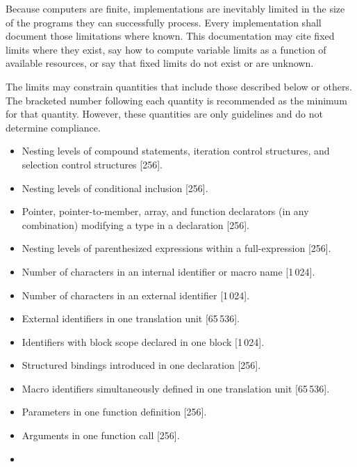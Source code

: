 
\pnum
Because computers are finite, \Cpp{}  implementations are inevitably
limited in the size of the programs they can successfully process.
Every implementation shall
document those limitations where known.
This documentation may cite fixed limits where they
exist, say how to compute variable limits as a function
of available resources, or say that fixed limits do not exist
or are unknown.

\pnum
The limits may constrain quantities
that include those described below or others.
The bracketed number following each quantity is recommended
as the minimum for that quantity.
However, these quantities are only guidelines and do not determine compliance.
\begin{itemize}
\item%
Nesting levels of compound statements,
iteration control structures,
and selection control structures [256].
\item%
Nesting levels of conditional inclusion [256].
\item%
Pointer,
pointer-to-member,
array, and
function
declarators (in any combination)
modifying a type in a declaration [256].
\item%
Nesting levels of parenthesized expressions within a full-expression [256].
\item%
Number of
characters in an internal identifier
or macro name [1\,024].
\item%
Number of
characters in an external identifier [1\,024].
\item%
External identifiers in one translation unit [65\,536].
\item%
Identifiers with block scope declared in one block [1\,024].
\item%
Structured bindings introduced in one declaration [256].
\item%
Macro identifiers simultaneously defined in one
translation
unit [65\,536].
\item%
Parameters in one function definition [256].
\item%
Arguments in one function call [256].
\item%

\end{itemize}
